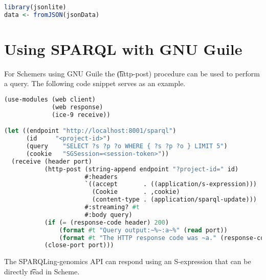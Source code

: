 \begin{lstlisting}[language=R]
library(jsonlite)
data <- fromJSON(jsonData)
\end{lstlisting}

\section{Using SPARQL with GNU Guile}
\label{sec:sparql-with-guile}

  For Schemers using GNU Guile the \t{(http-post)} procedure can be used
  to perform a query.  The following code snippet serves as an example.

\begin{lstlisting}[language=Lisp]
(use-modules (web client)
             (web response)
             (ice-9 receive))

(let ((endpoint "http://localhost:8001/sparql")
      (id     "<project-id>")
      (query    "SELECT ?s ?p ?o WHERE { ?s ?p ?o } LIMIT 5")
      (cookie   "SGSession=<session-token>"))
  (receive (header port)
           (http-post (string-append endpoint "?project-id=" id)
                      #:headers
                      `((accept       . ((application/s-expression)))
                        (Cookie       . ,cookie)
                        (content-type . (application/sparql-update)))
                      #:streaming? #t
                      #:body query)
           (if (= (response-code header) 200)
               (format #t "Query output:~%~:a~%" (read port))
               (format #t "The HTTP response code was ~a." (response-code header)))
           (close-port port)))
\end{lstlisting}

  The SPARQLing-genomics API can respond using an S-expression that can be directly
  \t{read} in Scheme.
